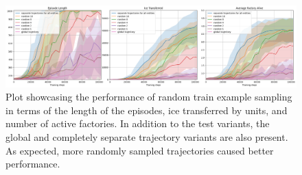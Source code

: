 \begin{figure}[htbp]
    \centering
    \includegraphics[width=1\linewidth]{images/results_hybrid/trajectory_sample_reduction_random/combined.png}
    \captionsetup{justification=justified, singlelinecheck=false, width=1\linewidth, labelfont=bf} 
    \caption[]{Plot showcasing the performance of random train example sampling in terms of the length of the episodes, ice transferred by units, and number of active factories. In addition to the test variants, the global and completely separate trajectory variants are also present. As expected, more randomly sampled trajectories caused better performance.}
    \label{fig:hybrid_results/trajectory_sample_reduction_random/combined}
\end{figure}

